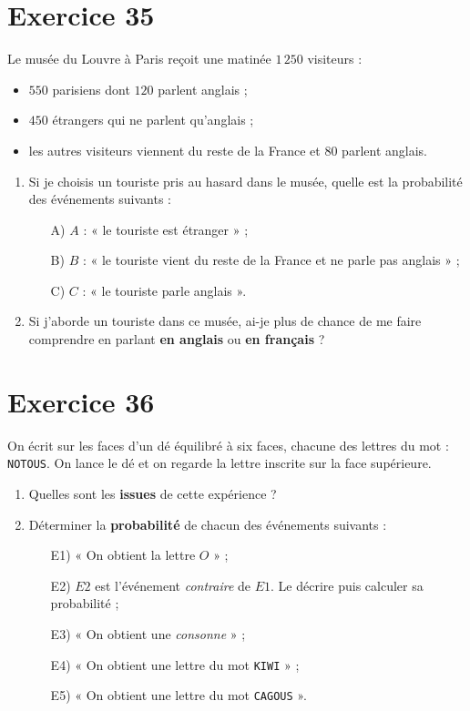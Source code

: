 \documentclass[a4paper,11pt]{article}
\begin{document}
\section*{Exercice 35}
Le musée du Louvre à Paris reçoit une matinée \(1\,250\) visiteurs :
\begin{itemize}
  \item \(550\) parisiens dont \(120\) parlent anglais ;
  \item \(450\) étrangers qui ne parlent qu’anglais ;
  \item les autres visiteurs viennent du reste de la France et \(80\) parlent anglais.
\end{itemize}
\begin{enumerate}
  \item Si je choisis un touriste pris au hasard dans le musée, quelle est la probabilité des événements suivants :
  \begin{enumerate}
    \item[A)] \(A\) : « le touriste est étranger » ;
    \item[B)] \(B\) : « le touriste vient du reste de la France et ne parle pas anglais » ;
    \item[C)] \(C\) : « le touriste parle anglais ».
  \end{enumerate}
  \item Si j’aborde un touriste dans ce musée, ai-je plus de chance de me faire comprendre en parlant \textbf{en anglais} ou \textbf{en français} ?
\end{enumerate}

\section*{Exercice 36}
On écrit sur les faces d’un dé équilibré à six faces, chacune des lettres du mot : \texttt{NOTOUS}. On lance le dé et on regarde la lettre inscrite sur la face supérieure.
\begin{enumerate}
  \item Quelles sont les \textbf{issues} de cette expérience ?
  \item Déterminer la \textbf{probabilité} de chacun des événements suivants :
  \begin{enumerate}
    \item[E1)] « On obtient la lettre \(O\) » ;
    \item[E2)] \(E2\) est l’événement \textit{contraire} de \(E1\). Le décrire puis calculer sa probabilité ;
    \item[E3)] « On obtient une \textit{consonne} » ;
    \item[E4)] « On obtient une lettre du mot \texttt{KIWI} » ;
    \item[E5)] « On obtient une lettre du mot \texttt{CAGOUS} ».
  \end{enumerate}
\end{enumerate}
\end{document}
